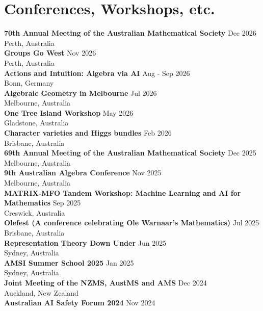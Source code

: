 \documentclass[8pt]{amsart}
\begin{document}
\section*{\LARGE Conferences, Workshops, etc.}
\raggedright
\textbf{70th Annual Meeting of the Australian Mathematical Society} \hfill Dec 2026 \\
\hfill Perth, Australia \\
\textbf{Groups Go West} \hfill Nov 2026 \\
\hfill Perth, Australia \\
\textbf{Actions and Intuition: Algebra via AI} \hfill Aug - Sep 2026 \\
\hfill Bonn, Germany \\
\textbf{Algebraic Geometry in Melbourne} \hfill Jul 2026 \\
\hfill Melbourne, Australia \\
\textbf{One Tree Island Workshop} \hfill May 2026 \\
\hfill Gladstone, Australia \\
\textbf{Character varieties and Higgs bundles} \hfill Feb 2026 \\
\hfill Brisbane, Australia \\
\textbf{69th Annual Meeting of the Australian Mathematical Society} \hfill Dec 2025 \\
\hfill Melbourne, Australia \\
\textbf{9th Australian Algebra Conference} \hfill Nov 2025 \\
\hfill Melbourne, Australia \\
\textbf{MATRIX-MFO Tandem Workshop: Machine Learning and AI for Mathematics} \hfill Sep 2025 \\
\hfill Creswick, Australia \\
\textbf{Olefest (A conference celebrating Ole Warnaar's Mathematics)} \hfill Jul 2025 \\
\hfill Brisbane, Australia \\
\textbf{Representation Theory Down Under} \hfill Jun 2025 \\
\hfill Sydney, Australia \\
\textbf{AMSI Summer School 2025} \hfill Jan 2025 \\
\hfill Sydney, Australia \\
\textbf{Joint Meeting of the NZMS, AustMS and AMS} \hfill Dec 2024 \\
\hfill Auckland, New Zealand \\
\textbf{Australian AI Safety Forum 2024} \hfill Nov 2024 \\
\end{document}
